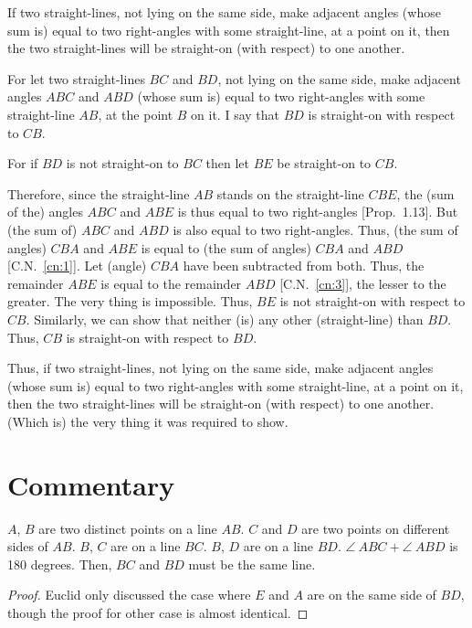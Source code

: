 If two straight-lines, not lying on the same side,  make adjacent angles (whose sum is) equal to two right-angles  with some straight-line, at a point on it, then the two straight-lines
will be straight-on (with respect) to one another.

For let two
straight-lines $BC$ and $BD$, not lying on the same side,  make adjacent angles $ABC$ and $ABD$ (whose sum is)
equal to two right-angles with some straight-line $AB$, at the point $B$ on it. I say
that $BD$ is  straight-on with respect to $CB$.

For if $BD$ is not straight-on to $BC$ then let $BE$ be straight-on to $CB$.

Therefore, since the straight-line $AB$ stands on the straight-line $CBE$, the (sum of the) angles $ABC$ and $ABE$ is thus equal to two right-angles [Prop.~1.13]. But (the sum of) $ABC$ and $ABD$ is also equal to two right-angles.
Thus, 
(the sum of angles) $CBA$ and $ABE$ is equal to (the sum of angles) $CBA$ and $ABD$ [C.N.~\ref{cn:1}]. Let (angle)
$CBA$ have been subtracted from both. Thus, the remainder $ABE$ is
equal to the remainder $ABD$ [C.N.~\ref{cn:3}], the lesser to the greater. The very thing is impossible. Thus, $BE$ is not straight-on with respect to $CB$. Similarly, we can
show that neither (is) any other (straight-line)   than $BD$.
Thus, $CB$ is straight-on with respect to $BD$.

Thus, if two straight-lines, not lying on the same side,  make adjacent angles (whose sum is) equal to two right-angles with some straight-line, at a point on it, then the two straight-lines
will be straight-on (with respect) to one another. (Which is) the very thing it
was required to show.


\section*{Commentary}

\begin{proposition}\label{proposition_14}\leanok
    $A$, $B$ are two distinct points on a line $AB$. $C$ and $D$ are two points on different sides of $AB$. $B$, $C$ are on a line $BC$. $B$, $D$ are on a line $BD$. $\angle~ABC + \angle~ABD$ is 180 degrees. Then, $BC$ and $BD$ must be the same line.
\end{proposition}
\begin{proof}
    \leanok
    Euclid only discussed the case where $E$ and $A$ are on the same side of $BD$, though the proof for other case is almost identical. 
\end{proof}


